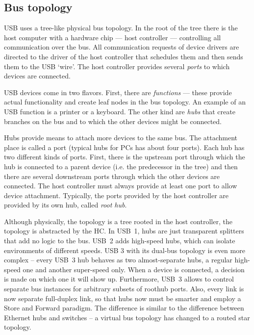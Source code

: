 \subsection{Bus topology}

USB uses a tree-like physical bus topology. In the root of the tree there is
the host computer with a hardware chip — host controller — controlling all
communication over the bus. All communication requests of device drivers are
directed to the driver of the host controller that schedules them and then
sends them to the USB ‘wire’. The host controller provides several
\textit{ports} to which devices are connected.

USB devices come in two flavors. First, there are \textit{functions} — these
provide actual functionality and create leaf nodes in the bus topology. An
example of an USB function is a printer or a keyboard. The other kind are
\textit{hubs} that create branches on the bus and to which the other devices
might be connected.

Hubs provide means to attach more devices to the same bus. The attachment place
is called a port (typical hubs for PCs has about four ports). Each hub has two
different kinds of ports. First, there is the upstream port through which the
hub is connected to a parent device (i.e. the predecessor in the tree) and then
there are several downstream ports through which the other devices are
connected. The host controller must always provide at least one port to allow
device attachment. Typically, the ports provided by the host controller are
provided by its own hub, called \textit{root hub}.

Although physically, the topology is a tree rooted in the host controller,
the topology is abstracted by the HC. In USB~1, hubs are just transparent
splitters that add no logic to the bus. USB~2 adds high-speed hubs, which can
isolate environments of different speeds. USB 3 with its dual-bus topology is
even more complex -- every USB~3 hub behaves as two almost-separate hubs,
a regular high-speed one and another super-speed only. When a device is
connected, a decision is made on which one it will show up. Furthermore, USB~3
allows to control separate bus instances for arbitrary subsets of roothub
ports. Also, every link is now separate full-duplex link, so that hubs now must
be smarter and employ a Store and Forward paradigm. The difference is similar
to the difference between Ethernet hubs and switches -- a virtual bus topology
has changed to a routed star topology.

